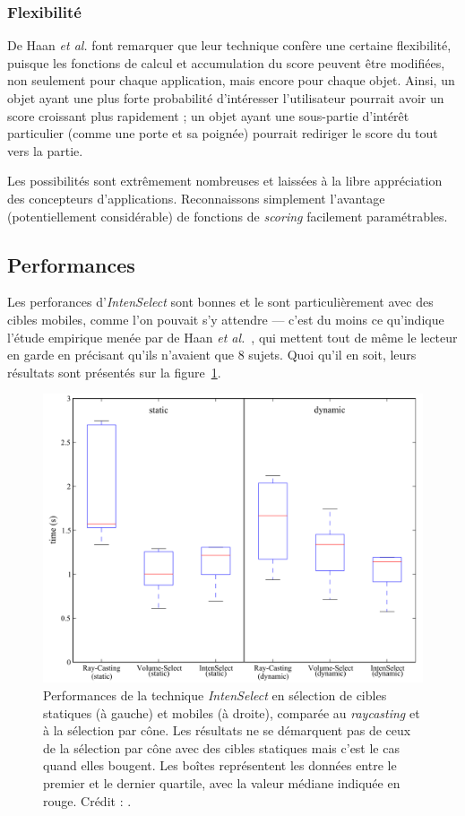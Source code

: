 	\subsubsection{Flexibilité}
	De Haan \emph{et al.} font remarquer que leur technique confère une certaine flexibilité, puisque les fonctions de calcul et accumulation du score peuvent être modifiées, non seulement pour chaque application, mais encore pour chaque objet. Ainsi, un objet ayant une plus forte probabilité d'intéresser l'utilisateur pourrait avoir un score croissant plus rapidement ; un objet ayant une sous-partie d'intérêt particulier (comme une porte et sa poignée) pourrait rediriger le score du tout vers la partie.
	
	Les possibilités sont extrêmement nombreuses et laissées à la libre appréciation des concepteurs d'applications. Reconnaissons simplement l'avantage (potentiellement considérable) de fonctions de \emph{scoring} facilement paramétrables.
	
	\subsection{Performances}
	Les perforances d'\emph{IntenSelect} sont bonnes et le sont particulièrement avec des cibles mobiles, comme l'on pouvait s'y attendre --- c'est du moins ce qu'indique l'étude empirique menée par de Haan \emph{et al.}~\cite{de2005intenselect}, qui mettent tout de même le lecteur en garde en précisant qu'ils n'avaient que 8 sujets. Quoi qu'il en soit, leurs résultats sont présentés sur la figure~\ref{fig:intensPerf}.
	
	\begin{figure}[H]
		\centering
		\includegraphics[width=\textwidth]{figures/ch2/intensPerf}
		\caption[\emph{IntenSelect} --- Performances]{Performances de la technique \emph{IntenSelect} en sélection de cibles statiques (à gauche) et mobiles (à droite), comparée au \emph{raycasting} et à la sélection par cône. Les résultats ne se démarquent pas de ceux de la sélection par cône avec des cibles statiques mais c'est le cas quand elles bougent. Les boîtes représentent les données entre le premier et le dernier quartile, avec la valeur médiane indiquée en rouge. Crédit : \cite{de2005intenselect}.}
		\label{fig:intensPerf}
	\end{figure}
	
